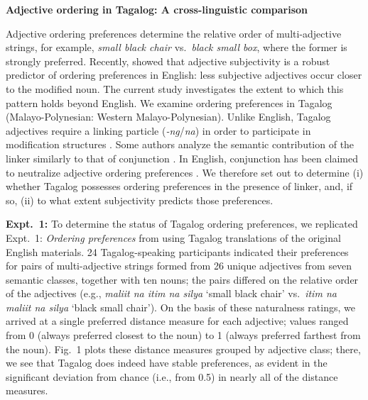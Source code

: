 \documentclass[10pt]{article}
\begin{document}

\begin{center}
	\textbf{Adjective ordering in Tagalog: A cross-linguistic comparison}
\end{center}
Adjective ordering preferences determine the relative order of multi-adjective strings, for example, \emph{small black chair} vs.~\emph{black small box}, where the former is strongly preferred. Recently, \cite{scontrasetal2017adjectives} showed that adjective subjectivity is a robust predictor of ordering preferences in English: less subjective adjectives occur closer to the modified noun. The current study investigates the extent to which this pattern holds beyond English. We examine ordering preferences in Tagalog (Malayo-Polynesian: Western Malayo-Polynesian). Unlike English, Tagalog adjectives require a linking particle (\emph{-ng}/\emph{na}) in order to participate in modification structures \citep{foley1975,rubin1994}. Some authors analyze the semantic contribution of the linker similarly to that of conjunction \citep{rubin1994,scontrasnicolae2014}. In English, conjunction has been claimed to neutralize adjective ordering preferences \citep{fordolsen1975,byrne1979}. We therefore set out to determine (i) whether Tagalog possesses ordering preferences in the presence of linker, and, if so, (ii) to what extent subjectivity predicts those preferences.

\textbf{Expt.~1:} To determine the status of Tagalog ordering preferences, we replicated Expt.~1: \emph{Ordering preferences} from \citeauthor{scontrasetal2017adjectives} using Tagalog translations of the original English materials. 24 Tagalog-speaking participants indicated their preferences for pairs of multi-adjective strings formed from 26 unique adjectives from seven semantic classes, together with ten nouns; the pairs differed on the relative order of the adjectives (e.g., \emph{maliit na itim na silya} `small black chair' vs.~\emph{itim na maliit na silya} `black small chair'). On the basis of these naturalness ratings, we arrived at a single preferred distance measure for each adjective; values ranged from 0 (always preferred closest to the noun) to 1 (always preferred farthest from the noun). Fig.~1 plots these distance measures grouped by adjective class; there, we see that Tagalog does indeed have stable preferences, as evident in the significant deviation from chance (i.e., from 0.5) in nearly all of the distance measures.
\end{document}
